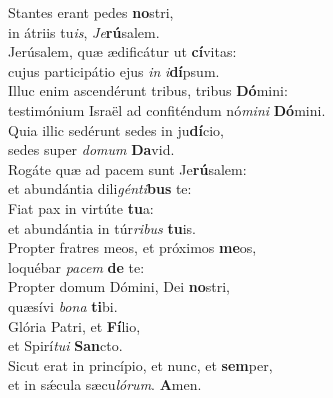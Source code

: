 \evenverse Stantes erant pedes \textbf{no}stri,~\*\\
\evenverse in átriis tu\textit{is}, \textit{Je}\textbf{rú}salem.\\
\oddverse Jerúsalem, quæ ædificátur ut \textbf{cí}vitas:~\*\\
\oddverse cujus participátio ejus \textit{in} \textit{i}\textbf{dí}psum.\\
\evenverse Illuc enim ascendérunt tribus, tribus \textbf{Dó}mini:~\*\\
\evenverse testimónium Israël ad confiténdum nó\textit{mi}\textit{ni} \textbf{Dó}mini.\\
\oddverse Quia illic sedérunt sedes in ju\textbf{dí}cio,~\*\\
\oddverse sedes super \textit{do}\textit{mum} \textbf{Da}vid.\\
\evenverse Rogáte quæ ad pacem sunt Je\textbf{rú}salem:~\*\\
\evenverse et abundántia dili\textit{gén}\textit{ti}\textbf{bus} te:\\
\oddverse Fiat pax in virtúte \textbf{tu}a:~\*\\
\oddverse et abundántia in túr\textit{ri}\textit{bus} \textbf{tu}is.\\
\evenverse Propter fratres meos, et próximos \textbf{me}os,~\*\\
\evenverse loquébar \textit{pa}\textit{cem} \textbf{de} te:\\
\oddverse Propter domum Dómini, Dei \textbf{no}stri,~\*\\
\oddverse quæsívi \textit{bo}\textit{na} \textbf{ti}bi.\\
\evenverse Glória Patri, et \textbf{Fí}lio,~\*\\
\evenverse et Spirí\textit{tu}\textit{i} \textbf{San}cto.\\
\oddverse Sicut erat in princípio, et nunc, et \textbf{sem}per,~\*\\
\oddverse et in sǽcula sæcu\textit{ló}\textit{rum}. \textbf{A}men.\\
